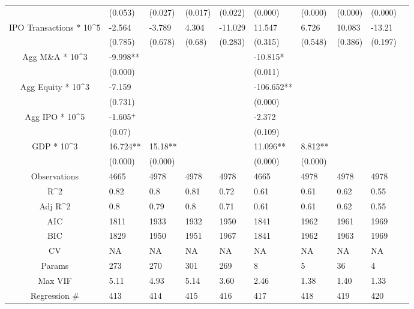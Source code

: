 \documentclass{article}
\begin{document}
\begin{table}[H]
\begin{tabular}{|clllllllll|}
   & (0.053) & (0.027) & (0.017) & (0.022) & (0.000) & (0.000) & (0.000) & (0.000) & \\ 
  IPO Transactions * 10^5 & -2.564 & -3.789 & 4.304 & -11.029 & 11.547 & 6.726 & 10.083 & -13.21 & \\ 
   & (0.785) & (0.678) & (0.68) & (0.283) & (0.315) & (0.548) & (0.386) & (0.197) & \\ 
  Agg M\&A * 10^3 & -9.998** &  &  &  & -10.815* &  &  &  & \\ 
   & (0.000) &  &  &  & (0.011) &  &  &  & \\ 
  Agg Equity * 10^3 & -7.159 &  &  &  & -106.652** &  &  &  & \\ 
   & (0.731) &  &  &  & (0.000) &  &  &  & \\ 
  Agg IPO * 10^5 & -1.605$^{+}$ &  &  &  & -2.372 &  &  &  & \\ 
   & (0.07) &  &  &  & (0.109) &  &  &  & \\ 
  GDP * 10^3 & 16.724** & 15.18** &  &  & 11.096** & 8.812** &  &  & \\ 
   & (0.000) & (0.000) &  &  & (0.000) & (0.000) &  &  & \\ 
  \hline 
 Observations & 4665 & 4978 & 4978 & 4978 & 4665 & 4978 & 4978 & 4978 & \\ 
  R^2 & 0.82 & 0.8 & 0.81 & 0.72 & 0.61 & 0.61 & 0.62 & 0.55 & \\ 
  Adj R^2 & 0.8 & 0.79 & 0.8 & 0.71 & 0.61 & 0.61 & 0.62 & 0.55 & \\ 
  AIC & 1811 & 1933 & 1932 & 1950 & 1841 & 1962 & 1961 & 1969 & \\ 
  BIC & 1829 & 1950 & 1951 & 1967 & 1841 & 1962 & 1963 & 1969 & \\ 
  CV & NA & NA & NA & NA & NA & NA & NA & NA & \\ 
  Params & 273 & 270 & 301 & 269 & 8 & 5 & 36 & 4 & \\ 
  Max VIF & 5.11 & 4.93 & 5.14 & 3.60 & 2.46 & 1.38 & 1.40 & 1.33 & \\ 
  Regression \# & 413 & 414 & 415 & 416 & 417 & 418 & 419 & 420 & \\ 
   \hline
\end{tabular}
 
\end{table}
\end{document}
